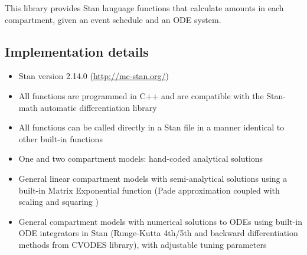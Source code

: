 \documentclass[11pt]{amsart}
\begin{document}
This library provides Stan language functions that calculate amounts in each compartment, given an event schedule and an ODE system.
    
\subsection{Implementation details}
\begin{itemize}
  \item Stan version 2.14.0 (\url{http://mc-stan.org/})
  \item All functions are programmed in C++ and are compatible with the Stan-math automatic differentiation library \cite{AD}
  \item All functions can be called directly in a Stan file in a manner identical to other built-in functions
  \item One and two compartment models: hand-coded analytical solutions
  \item General linear compartment models with semi-analytical solutions using a built-in Matrix Exponential function (Pade approximation coupled with scaling and squaring \cite{matrixExp})
  \item General compartment models with numerical solutions to ODEs using built-in ODE integrators in Stan (Runge-Kutta 4th/5th and backward differentiation methods from CVODES library), with adjustable tuning parameters
\end{itemize}
\end{document}
